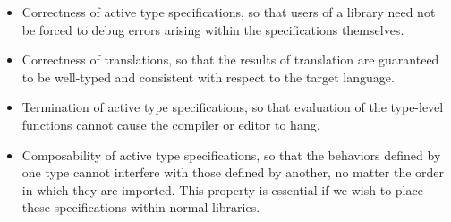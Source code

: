 \begin{itemize}
\item Correctness of active type specifications, so that users of a library need not be forced to debug errors arising within the specifications themselves.
\item Correctness of translations, so that the results of translation are guaranteed to be well-typed and consistent with respect to the target language.
\item Termination of active type specifications, so that evaluation of the type-level functions cannot cause the compiler or editor to hang.
\item Composability of active type specifications, so that the behaviors defined by one type cannot interfere with those defined by another, no matter the order in which they are imported. This property is essential if we wish to place these specifications within normal libraries.
\end{itemize}


